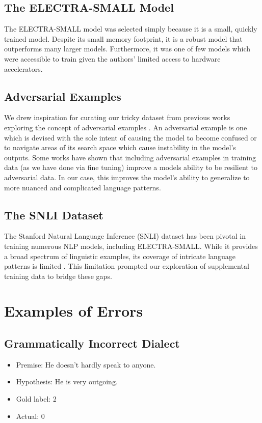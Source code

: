 \documentclass{article}
\begin{document}
\subsection{The ELECTRA-SMALL Model}
The ELECTRA-SMALL model was selected simply because it is a small, quickly trained model. Despite its small memory footprint,
it is a robust model that outperforms many larger models. Furthermore, it was one of few models which were accessible to train
given the authors' limited access to hardware accelerators.

\subsection{Adversarial Examples}
We drew inspiration for curating our tricky dataset from previous works exploring the concept of adversarial examples \cite{gardner2020evaluating,glockner2018breaking,jia2017adversarial}. An
adversarial example is one which is devised with the sole intent of causing the model to become confused or to navigate
areas of its search space which cause instability in the model's outputs. Some works have shown that including adversarial
examples in training data (as we have done via fine tuning) improve a models ability to be resilient to adversarial data.
In our case, this improves the model's ability to generalize to more nuanced and complicated language patterns.

\subsection{The SNLI Dataset}
The Stanford Natural Language Inference (SNLI) dataset has been pivotal in training numerous NLP models, including ELECTRA-SMALL.
While it provides a broad spectrum of linguistic examples, its coverage of intricate language patterns is limited \cite{bowman-etal-2015-large}. This limitation prompted our exploration of supplemental training data to bridge these gaps.


\section{Examples of Errors}
\subsection{Grammatically Incorrect Dialect}
\begin{itemize}
	\item Premise: He doesn’t hardly speak to anyone.
	\item Hypothesis: He is very outgoing.
	\item Gold label: 2
	\item Actual: 0
\end{itemize}
\end{document}
